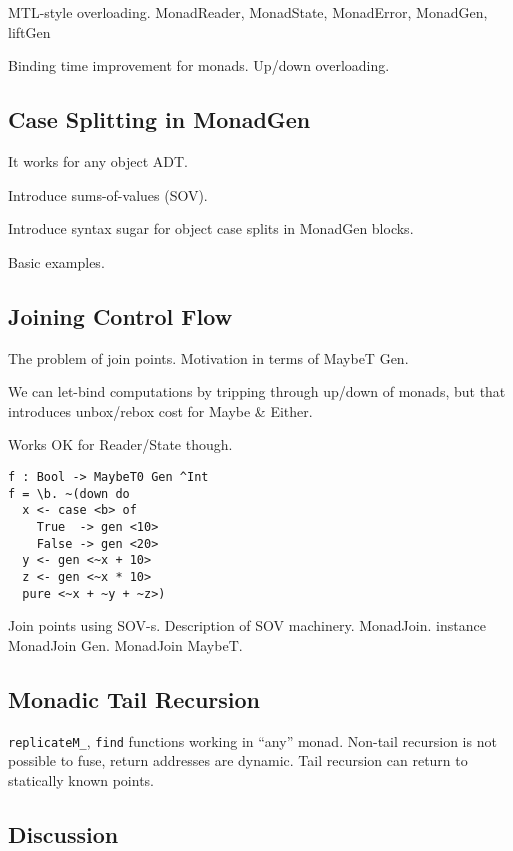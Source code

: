 \documentclass[acmsmall,screen,review,anonymous]{acmart}
\begin{document}
MTL-style overloading. MonadReader, MonadState, MonadError, MonadGen, liftGen

Binding time improvement for monads. Up/down overloading.

\subsection{Case Splitting in MonadGen}\label{sec:case-splitting-in-monadgen}

It works for any object ADT.

Introduce sums-of-values (SOV).

Introduce syntax sugar for object case splits in MonadGen blocks.

Basic examples.

\subsection{Joining Control Flow}\label{sec:rejoining-control-flow}

The problem of join points. Motivation in terms of MaybeT Gen.

We can let-bind computations by tripping through up/down of monads,
but that introduces unbox/rebox cost for Maybe \& Either.

Works OK for Reader/State though.

\begin{verbatim}
f : Bool -> MaybeT0 Gen ^Int
f = \b. ~(down do
  x <- case <b> of
    True  -> gen <10>
    False -> gen <20>
  y <- gen <~x + 10>
  z <- gen <~x * 10>
  pure <~x + ~y + ~z>)
\end{verbatim}

Join points using SOV-s. Description of SOV machinery. MonadJoin.
instance MonadJoin Gen. MonadJoin MaybeT.

\subsection{Monadic Tail Recursion}\label{sec:monadic-tail-recursion}

\texttt{replicateM\_}, \texttt{find} functions working in ``any'' monad.
Non-tail recursion is not possible to fuse, return addresses are dynamic.
Tail recursion can return to statically known points.

\subsection{Discussion}
\end{document}
